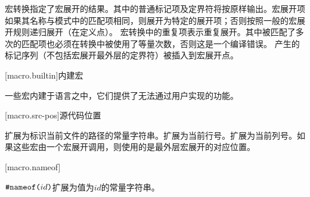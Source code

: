 \pnum
宏转换指定了宏展开的结果。其中的普通标记项及定界符将按原样输出。宏展开项如果其名称与模式中的匹配项相同，则展开为特定的展开项；否则按照一般的宏展开规则递归展开（在定义点）。
宏转换中的重复项表示重复展开。其中被匹配了多次的匹配项也必须在转换中被使用了等量次数，否则这是一个编译错误。
产生的标记序列（不包括宏展开最外层的定界符）被插入到宏展开点。

[macro.builtin]{内建宏}

\pnum
一些宏内建于语言之中，它们提供了无法通过用户实现的功能。

[macro.src-pos]{源代码位置}

\pnum
{}扩展为标识当前文件的路径的常量字符串。扩展为当前行号。扩展为当前列号。如果这些宏由一个宏展开调用，则使用的是最外层宏展开的对应位置。

[macro.nameof]{}

\pnum
$\texttt{\#nameof(}id\texttt{)}$扩展为值为$id$的常量字符串。
